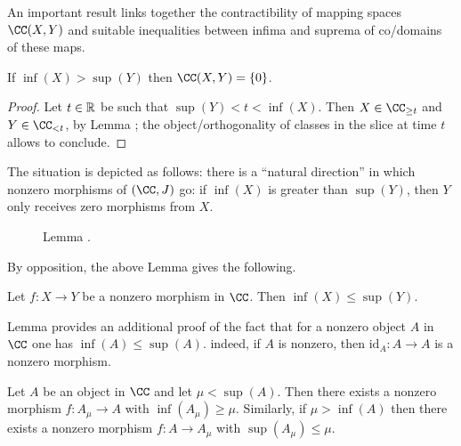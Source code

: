 An important result links together the contractibility of mapping spaces $\CC(X,Y)$ and suitable inequalities between infima and suprema of co\fshyp{}domains of these maps.
\begin{lemma}\label{lem.zero.morphism}
If $\inf(X)>\sup(Y)$ then $\CC(X,Y)=\{0\}$.
\end{lemma}
\begin{proof}
Let $t\in \mathbb{R}$ be such that $\sup(Y)<t<\inf(X)$. Then $X\in \CC_{\geq t}$ and $Y\in \CC_{<t}$, by Lemma ; the object\fshyp{}orthogonality of classes in the slice at time $t$ allows to conclude.
\end{proof}
The situation is depicted as follows: there is a ``natural direction'' in which nonzero morphisms of $(\CC,J)$ go: if $\inf(X)$ is greater than $\sup(Y)$, then $Y$ only receives zero morphisms from $X$.
\begin{center}
\begin{figure}[H]
\caption{Lemma .}
\end{figure}
\end{center}
By opposition, the above Lemma gives the following.
\begin{lemma}\label{lem.opposite}
Let $f\colon X\to Y$ be a nonzero morphism in $\CC$. Then $\inf(X)\leq \sup(Y)$.
\end{lemma}
\begin{remark}
Lemma  provides an additional proof of the fact that for a nonzero object $A$ in $\CC$ one has $\inf(A)\leq \sup(A)$. indeed, if $A$ is nonzero, then $\mathrm{id}_A\colon A\to A$ is a nonzero morphism.
\end{remark}
\begin{lemma}\label{lem.exists.morphism}
Let $A$ be an object in $\CC$ and let $\mu<\sup(A)$. Then there exists a nonzero morphism $f\colon A_\mu\to A$ with $\inf(A_\mu)\geq \mu$.  Similarly, if $\mu>\inf(A)$ then there exists a nonzero morphism $f\colon A\to A_\mu$ with $\sup(A_\mu)\leq \mu$.
\end{lemma}
